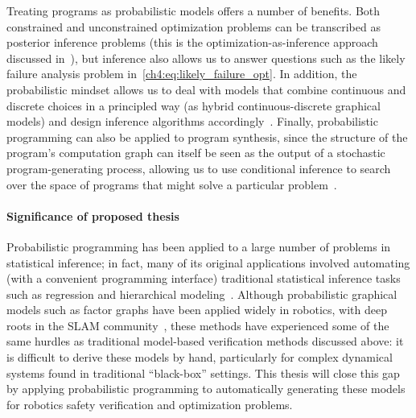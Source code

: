 Treating programs as probabilistic models offers a number of benefits. Both constrained and unconstrained optimization problems can be transcribed as posterior inference problems (this is the optimization-as-inference approach discussed in~\cite{maSamplingCanBe2019,levineReinforcementLearningControl2018a}), but inference also allows us to answer questions such as the likely failure analysis problem in~\eqref{ch4:eq:likely_failure_opt}. In addition, the probabilistic mindset allows us to deal with models that combine continuous and discrete choices in a principled way (as hybrid continuous-discrete graphical models) and design inference algorithms accordingly~\cite{cusumano-townerGenGeneralpurposeProbabilistic2019}. Finally, probabilistic programming can also be applied to program synthesis, since the structure of the program's computation graph can itself be seen as the output of a stochastic program-generating process, allowing us to use conditional inference to search over the space of programs that might solve a particular problem~\cite{cusumano-townerAutomatingInvolutiveMCMC2020}.

\paragraph{Significance of proposed thesis} Probabilistic programming has been applied to a large number of problems in statistical inference; in fact, many of its original applications involved automating (with a convenient programming interface) traditional statistical inference tasks such as regression and hierarchical modeling~\cite{cusumano-townerGenGeneralpurposeProbabilistic2019}. Although probabilistic graphical models such as factor graphs have been applied widely in robotics, with deep roots in the SLAM community~\cite{dellaertFactorGraphsExploiting2021}, these methods have experienced some of the same hurdles as traditional model-based verification methods discussed above: it is difficult to derive these models by hand, particularly for complex dynamical systems found in traditional ``black-box'' settings. This thesis will close this gap by applying probabilistic programming to automatically generating these models for robotics safety verification and optimization problems.

